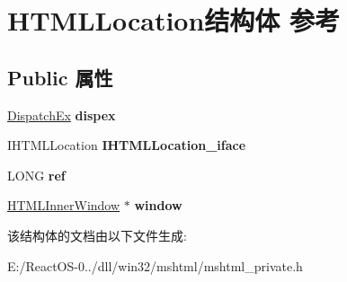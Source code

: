 \hypertarget{struct_h_t_m_l_location}{}\section{H\+T\+M\+L\+Location结构体 参考}
\label{struct_h_t_m_l_location}
\subsection*{Public 属性}
\begin{DoxyCompactItemize}
\item 
\mbox{\label{struct_h_t_m_l_location_a8750b9ce4000486a3087f0071294c63e}} 
\hyperlink{struct_dispatch_ex}{Dispatch\+Ex} {\bfseries dispex}
\item 
\mbox{\label{struct_h_t_m_l_location_a34230e29b4181ea70cb56d1095d6037f}} 
I\+H\+T\+M\+L\+Location {\bfseries I\+H\+T\+M\+L\+Location\+\_\+iface}
\item 
\mbox{\label{struct_h_t_m_l_location_ab98604ae8502d707ae03ce08e76ddd8d}} 
L\+O\+NG {\bfseries ref}
\item 
\mbox{\label{struct_h_t_m_l_location_aec42438d893e48a02a7ee97ba85dbad7}} 
\hyperlink{struct_h_t_m_l_inner_window}{H\+T\+M\+L\+Inner\+Window} $\ast$ {\bfseries window}
\end{DoxyCompactItemize}


该结构体的文档由以下文件生成\+:\begin{DoxyCompactItemize}
\item 
E\+:/\+React\+O\+S-\/0../dll/win32/mshtml/mshtml\+\_\+private.\+h\end{DoxyCompactItemize}
